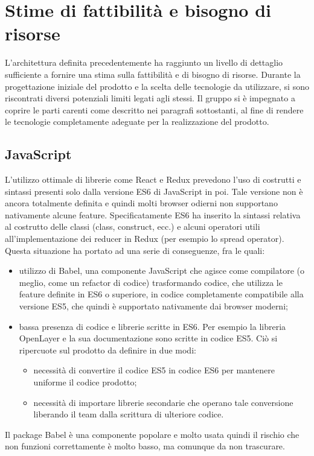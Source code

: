 \newpage

\section{Stime di fattibilità e bisogno di risorse}
\label{sec:sdf}

L'architettura definita precedentemente ha raggiunto un livello di dettaglio sufficiente a fornire una stima sulla fattibilità e di bisogno di risorse.
Durante la progettazione iniziale del prodotto e la scelta delle tecnologie da utilizzare, si sono riscontrati diversi potenziali limiti legati agli stessi.
Il gruppo si è impegnato a coprire le parti carenti come descritto nei paragrafi sottostanti, al fine di rendere le tecnologie completamente adeguate per la realizzazione del prodotto.

\subsection{JavaScript}

L'utilizzo ottimale di librerie come React e Redux prevedono l'uso di costrutti e sintassi presenti solo dalla versione ES6 di JavaScript in poi. Tale versione non è ancora totalmente definita e quindi molti browser odierni non supportano nativamente alcune feature. Specificatamente ES6 ha inserito la sintassi relativa al costrutto delle classi (class, construct, ecc.) e alcuni operatori utili all'implementazione dei reducer in Redux (per esempio lo spread operator). Questa situazione ha portato ad una serie di conseguenze, fra le quali:
\begin{itemize}
	\item utilizzo di Babel, una componente JavaScript che agisce come compilatore (o meglio, come un refactor di codice) trasformando codice, che utilizza le feature definite in ES6 o superiore, in codice completamente compatibile alla versione ES5, che quindi è supportato nativamente dai browser moderni;
	\item bassa presenza di codice e librerie scritte in ES6. Per esempio la libreria OpenLayer e la sua documentazione sono scritte in codice ES5. Ciò si ripercuote sul prodotto da definire in due modi:
	\begin{itemize}
		\item necessità di convertire il codice ES5 in codice ES6 per mantenere uniforme il codice prodotto;
		\item necessità di importare librerie secondarie che operano tale conversione liberando il team dalla scrittura di ulteriore codice.
	\end{itemize}
\end{itemize}
Il package Babel è una componente popolare e molto usata quindi il rischio che  non funzioni correttamente è molto basso, ma comunque da non trascurare.

